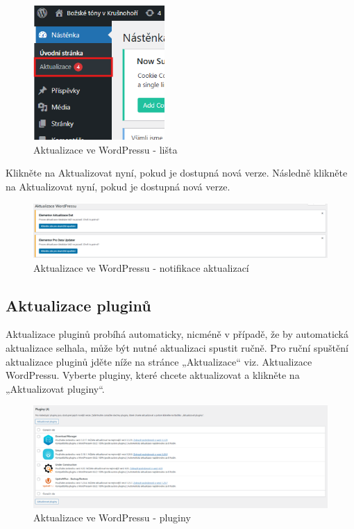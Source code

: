 \documentclass[12pt,a4paper]{article}
\begin{document}
	\begin{figure}[htp]
		\centering
		\includegraphics[width=5cm]{WPupdate1}
		\caption{Aktualizace ve WordPressu - lišta}
		\label{fig:role}
	\end{figure}
	
	Klikněte na Aktualizovat nyní, pokud je dostupná nová verze. Následně klikněte na Aktualizovat nyní, pokud je dostupná nová verze.
	
	\begin{figure}[htp]
		\centering
		\includegraphics[width=18cm]{WPupdatesite}
		\caption{Aktualizace ve WordPressu - notifikace aktualizací}
		\label{fig:role}
	\end{figure}
	
	\subsection{Aktualizace pluginů}
	Aktualizace pluginů probíhá automaticky, nicméně v případě, že by automatická aktualizace selhala, může být nutné aktualizaci spustit ručně. Pro ruční spuštění aktualizace pluginů jděte níže na stránce „Aktualizace“ viz. Aktualizace WordPressu. Vyberte pluginy, které chcete aktualizovat a klikněte na „Aktualizovat pluginy“.
	
		
	\begin{figure}[htp]
		\centering
		\includegraphics[width=18cm]{WPupdateplugin}
		\caption{Aktualizace ve WordPressu - pluginy}
		\label{fig:role}
	\end{figure}
	
\end{document}

